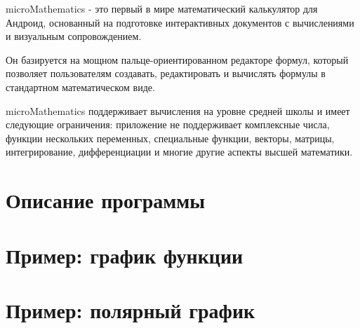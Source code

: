 \documentclass[DIV=calc, paper=a4, fontsize=11pt, twocolumn]{scrartcl}
\begin{document}
\maketitle
\thispagestyle{fancy} %

\begin{bf}
microMathematics - это первый в мире математический
калькулятор для Андроид, основанный на подготовке интерактивных документов с
вычислениями и визуальным сопровождением.

Он базируется на мощном пальце-ориентированном редакторе формул, который
позволяет пользователям создавать, редактировать и вычислять формулы в
стандартном математическом виде.

microMathematics поддерживает вычисления на уровне средней школы и имеет
следующие ограничения: приложение не поддерживает комплексные числа, функции
нескольких переменных, специальные функции, векторы, матрицы, интегрирование,
дифференциации и многие другие аспекты высшей математики.
\end{bf}

\section{Описание программы}


\section{Пример: график функции}


\section{Пример: полярный график}

\end{document}
